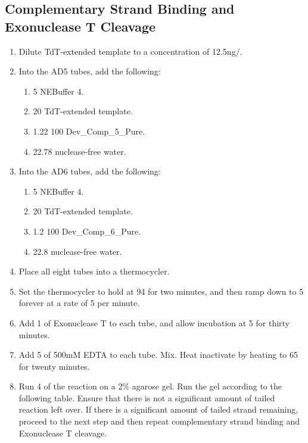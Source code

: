 \documentclass{ssiBio}
\begin{document}
\subsection{Complementary Strand Binding and Exonuclease T Cleavage}
\begin{enumerate}
\item{Dilute TdT-extended template to a concentration of 12.5ng/\uL{}.}
\item{Into the AD5 tubes, add the following:}
\begin{enumerate}
  \item{5\uL{} NEBuffer 4.}
  \item{20\uL{} TdT-extended template.}
  \item{1.22\uL{} 100\uM{} Dev\_Comp\_5\_Pure.}
  \item{22.78\uL{} nuclease-free water.}
\end{enumerate}
\item{Into the AD6 tubes, add the following:}
\begin{enumerate}
  \item{5\uL{} NEBuffer 4.}
  \item{20\uL{} TdT-extended template.}
  \item{1.2\uL{} 100\uM{} Dev\_Comp\_6\_Pure.}
  \item{22.8\uL{} nuclease-free water.}
\end{enumerate}
\item{Place all eight tubes into a thermocycler.}
\item{Set the thermocycler to hold at 94\C{} for two minutes, and then ramp down to 5\C{} forever at a rate of 5\C{} per minute.}
\item{Add 1\uL{} of Exonuclease T to each tube, and allow incubation at 5\C{} for thirty minutes.}
\item{Add 5\uL{} of 500mM EDTA to each tube. Mix. Heat inactivate by heating to 65\C{} for twenty minutes.}
\item{Run 4\uL{} of the reaction on a 2\% agarose gel. Run the gel according to the following table. Ensure that there is not a significant amount of tailed reaction left over. If there is a significant amount of tailed strand remaining, proceed to the next step and then repeat complementary strand binding and Exonuclease T cleavage.}
  \begin{table}[ht]

\end{table}
\end{enumerate}
\end{document}
